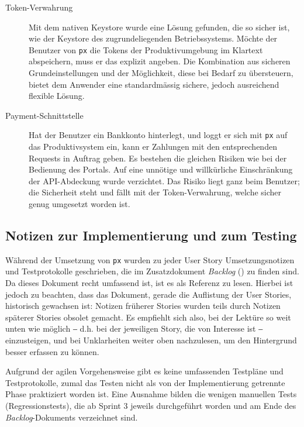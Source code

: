 \begin{description}
    \item[Token-Verwahrung] Mit dem nativen Keystore wurde eine Lösung gefunden, die so sicher ist, wie der Keystore des zugrundeliegenden Betriebssystems. Möchte der Benutzer von \texttt{px} die Tokens der Produktivumgebung im Klartext abspeichern, muss er das explizit angeben. Die Kombination aus sicheren Grundeinstellungen und der Möglichkeit, diese bei Bedarf zu übersteuern, bietet dem Anwender eine standardmässig sichere, jedoch ausreichend flexible Lösung.
    \item[Payment-Schnittstelle] Hat der Benutzer ein Bankkonto hinterlegt, und loggt er sich mit \texttt{px} auf das Produktivsystem ein, kann er Zahlungen mit den entsprechenden Requests in Auftrag geben. Es bestehen die gleichen Risiken wie bei der Bedienung des Portals. Auf eine unnötige und willkürliche Einschränkung der API-Abdeckung wurde verzichtet. Das Risiko liegt ganz beim Benutzer; die Sicherheit steht und fällt mit der Token-Verwahrung, welche sicher genug umgesetzt worden ist.
\end{description}

\subsection{Notizen zur Implementierung und zum Testing}

Während der Umsetzung von \texttt{px} wurden zu jeder User Story Umsetzungsnotizen und Testprotokolle geschrieben, die im Zusatzdokument \textit{Backlog} () zu finden sind. Da dieses Dokument recht umfassend ist, ist es als Referenz zu lesen. Hierbei ist jedoch zu beachten, dass das Dokument, gerade die Auflistung der User Stories, historisch gewachsen ist: Notizen früherer Stories wurden teils durch Notizen späterer Stories obsolet gemacht. Es empfiehlt sich also, bei der Lektüre so weit unten wie möglich ‒ d.h. bei der jeweiligen Story, die von Interesse ist ‒ einzusteigen, und bei Unklarheiten weiter oben nachzulesen, um den Hintergrund besser erfassen zu können.

Aufgrund der agilen Vorgehensweise gibt es keine umfassenden Testpläne und Testprotokolle, zumal das Testen nicht als von der Implementierung getrennte Phase praktiziert worden ist. Eine Ausnahme bilden die wenigen manuellen Tests (Regressionstests), die ab Sprint 3 jeweils durchgeführt worden und am Ende des \textit{Backlog}-Dokuments verzeichnet sind.
